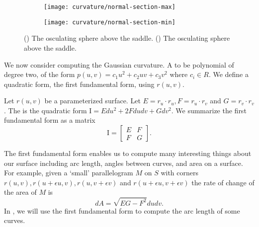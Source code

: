 \begin{figure}[htb]
    \captionsetup[subfigure]{justification=centering}
    \centering
    \begin{subfigure}[b]{0.25\textwidth}
        \texttt{[image: curvature/normal-section-max]}
       \subcaption{}\label{fig:normal-section-max}
    \end{subfigure}
        \hspace{1cm}
        \begin{subfigure}[b]{0.25\textwidth}
        \texttt{[image: curvature/normal-section-min]}
        \subcaption{}\label{fig:normal-section-min}
        \end{subfigure}
    \caption{() The osculating sphere above the saddle.
        () The osculating sphere above the saddle.
    }
    \label{fig:normal-sections}
\end{figure}


We now consider computing the Gaussian curvature.
A  to be polynomial of degree two, of the form $p(u,v)=c_1u^2+c_2uv+c_3v^2$ 
where $c_i\in R$.
We define a quadratic form, the first fundamental form, using $r(u,v)$.

Let $r(u,v)$ be a parameterized surface.
Let $E=r_u\cdot r_u, F=r_u\cdot r_v$ and  $G=r_v\cdot r_v$.
The 
is the quadratic form $\mathrm{I}=Edu^2+2Fdudv +Gdv^2$.
We summarize the first fundamental form as a matrix $$\mathrm{I}=\begin{bmatrix}
E & F \\
F & G 
\end{bmatrix}.$$

The first fundamental form enables us to  compute many interesting
things about our surface including arc length, angles between curves,
and area on a surface.
For example,
given a `small' parallelogram $M$ on $S$ with corners $r(u,v),r(u+\epsilon u, v), r(u,v+\epsilon v)$ 
and $r(u+\epsilon u, v+\epsilon v)$ the rate of change of the area of $M$ is 
$$dA=\sqrt{EG-F^2}dudv.$$
In , we will use the first fundamental form to compute the arc length of some curves.


